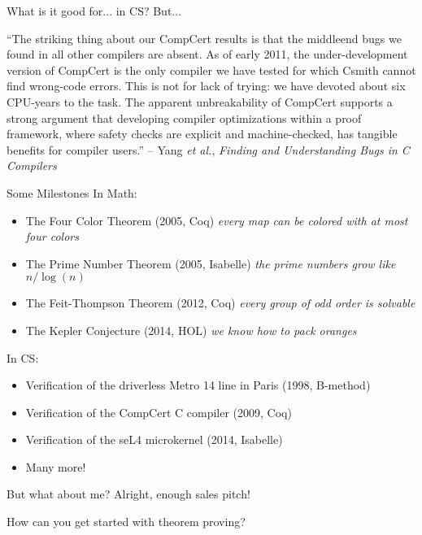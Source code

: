 \documentclass{beamer}
\begin{document}
\begin{frame}{What is it good for... in CS?}
  But...
  \begin{center}
    ``The striking thing about our CompCert results is that the
    middleend bugs we found in all other compilers are absent. As of
    early 2011, the under-development version of CompCert is the only
    compiler we have tested for which Csmith cannot find
    wrong-code errors. This is not for lack of trying: we have devoted
    about six CPU-years to the task. The apparent unbreakability of
    CompCert supports a strong argument that developing compiler
    optimizations within a proof framework, where safety checks are
    explicit and machine-checked, has tangible benefits for compiler
    users.'' -- Yang {\it et al.}, {\it Finding and Understanding Bugs
      in C Compilers}
  \end{center}
\end{frame}

\begin{frame}{Some Milestones}
  In Math:
  \begin{itemize}
  \item The Four Color Theorem (2005, Coq) \emph{every map can be colored with at most four colors}
  \item The Prime Number Theorem (2005, Isabelle) \emph{the prime numbers grow like $n/\log(n)$}
  \item The Feit-Thompson Theorem (2012, Coq) \emph{every group of odd order is solvable}
  \item The Kepler Conjecture (2014, HOL) \emph{we know how to pack oranges}
  \end{itemize}
  In CS:
  \begin{itemize}
  \item Verification of the driverless Metro 14 line in Paris (1998, B-method)
  \item Verification of the CompCert C compiler (2009, Coq)
  \item Verification of the seL4 microkernel (2014, Isabelle)
  \item Many more!
  \end{itemize}
\end{frame}

\begin{frame}{But what about me?}
  Alright, enough sales pitch!\bigskip

  How can you get started with theorem proving?
\end{frame}
\end{document}
